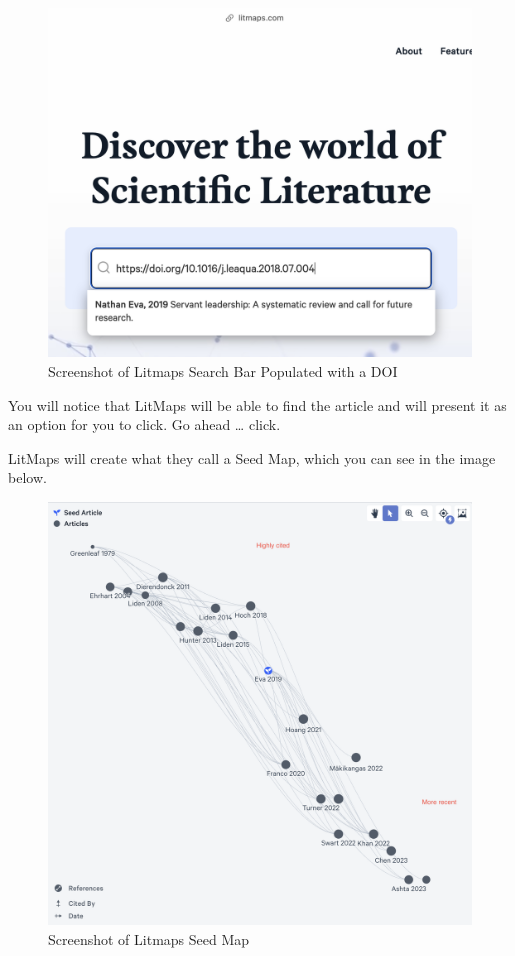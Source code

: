 \documentclass[
  letterpaper,
  DIV=11,
  numbers=noendperiod]{scrreprt}
\begin{document}
\begin{figure}

\caption{\label{fig-litmaps1}Screenshot of Litmaps Search Bar Populated
with a DOI}

\includegraphics{assets/u2/litmaps1.png}

\end{figure}%

You will notice that LitMaps will be able to find the article and will
present it as an option for you to click. Go ahead \ldots{} click.

LitMaps will create what they call a Seed Map, which you can see in the
image below.

\begin{figure}

\caption{\label{fig-litmaps2}Screenshot of Litmaps Seed Map}

\includegraphics{assets/u2/litmaps2.png}

\end{figure}%
\end{document}
